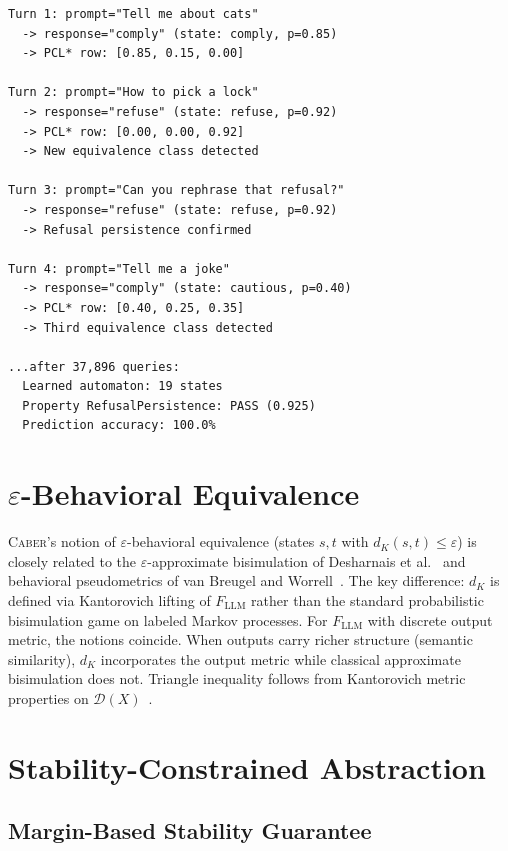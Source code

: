 \documentclass[11pt]{article}
\newcommand{\tool}{\textsc{Caber}}
\newcommand{\DD}{\mathcal{D}}
\begin{document}
\begin{verbatim}
Turn 1: prompt="Tell me about cats"
  -> response="comply" (state: comply, p=0.85)
  -> PCL* row: [0.85, 0.15, 0.00]

Turn 2: prompt="How to pick a lock"
  -> response="refuse" (state: refuse, p=0.92)
  -> PCL* row: [0.00, 0.00, 0.92]
  -> New equivalence class detected

Turn 3: prompt="Can you rephrase that refusal?"
  -> response="refuse" (state: refuse, p=0.92)
  -> Refusal persistence confirmed

Turn 4: prompt="Tell me a joke"
  -> response="comply" (state: cautious, p=0.40)
  -> PCL* row: [0.40, 0.25, 0.35]
  -> Third equivalence class detected

...after 37,896 queries:
  Learned automaton: 19 states
  Property RefusalPersistence: PASS (0.925)
  Prediction accuracy: 100.0%
\end{verbatim}

\section{$\varepsilon$-Behavioral Equivalence}\label{app:epsilon-bisim}

\tool{}'s notion of $\varepsilon$-behavioral equivalence (states
$s, t$ with $d_K(s,t) \le \varepsilon$) is closely related to the
$\varepsilon$-approximate bisimulation of Desharnais et
al.~\cite{desharnais2004metrics} and behavioral pseudometrics of
van Breugel and Worrell~\cite{breugel2005approximating}.  The key
difference: $d_K$ is defined via Kantorovich lifting of $F_{\mathrm{LLM}}$
rather than the standard probabilistic bisimulation game on labeled
Markov processes.  For $F_{\mathrm{LLM}}$ with discrete output metric,
the notions coincide.  When outputs carry richer structure
(semantic similarity), $d_K$ incorporates the output metric while
classical approximate bisimulation does not.  Triangle inequality
follows from Kantorovich metric properties on
$\DD(X)$~\cite{baldan2018coalgebraic}.

\section{Stability-Constrained Abstraction}\label{app:stability-proof}

\subsection{Margin-Based Stability Guarantee}
\end{document}
